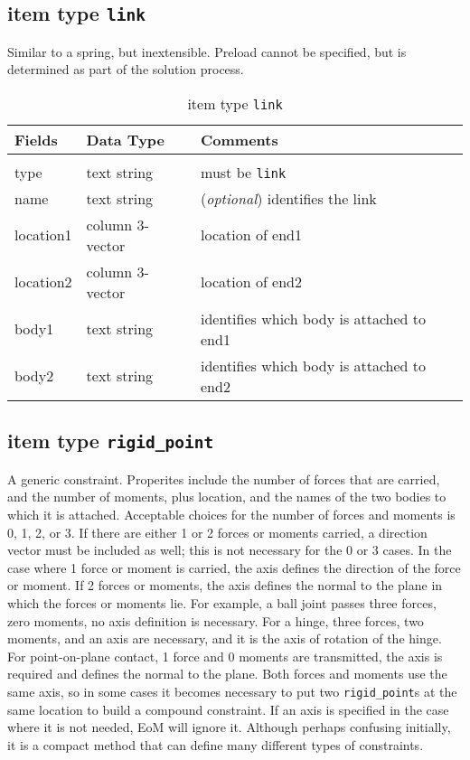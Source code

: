 \subsection{item type \texttt{link}}
Similar to a spring, but inextensible.  Preload cannot be specified, but is determined as part of the solution process.

\begin{table}[!h]
\caption{item type \texttt{link}}
\label{link}
\begin{center}
\begin{tabular}{lll}
\toprule
Fields & Data Type & Comments\\
\midrule\\
type & text string & must be \texttt{link}\\
name & text string & (\emph{optional}) identifies the link\\
location1 & column 3-vector & location of end1\\
location2 & column 3-vector & location of end2\\
body1 & text string & identifies which body is attached to end1\\
body2 & text string & identifies which body is attached to end2\\
\bottomrule
\end{tabular}
\end{center}
\end{table}
\clearpage

\subsection{item type \texttt{rigid\_point}}
A generic constraint. Properites include the number of forces that are carried, and the number of moments, plus location, and the names of the two bodies to which it is attached.  Acceptable choices for the number of forces and moments is 0, 1, 2, or 3. If there are either 1 or 2 forces or moments carried, a direction vector must be included as well; this is not necessary for the 0 or 3 cases. In the case where 1 force or moment is carried, the axis defines the direction of the force or moment. If 2 forces or moments, the axis defines the normal to the plane in which the forces or moments lie.  For example, a ball joint passes three forces, zero moments, no axis definition is necessary.  For a hinge, three forces, two moments, and an axis are necessary, and it is the axis of rotation of the hinge.  For point-on-plane contact, 1 force and 0 moments are transmitted, the axis is required and defines the normal to the plane.  Both forces and moments use the same axis, so in some cases it becomes necessary to put two \texttt{rigid\_point}s at the same location to build a compound constraint.  If an axis is specified in the case where it is not needed, EoM will ignore it.  Although perhaps confusing initially, it is a compact method that can define many different types of constraints.

